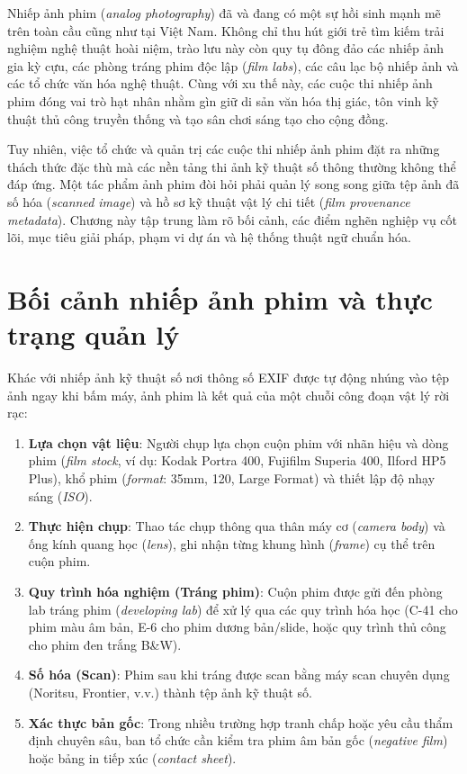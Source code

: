
Nhiếp ảnh phim (\textit{analog photography}) đã và đang có một sự hồi sinh mạnh mẽ trên toàn cầu cũng như tại Việt Nam. Không chỉ thu hút giới trẻ tìm kiếm trải nghiệm nghệ thuật hoài niệm, trào lưu này còn quy tụ đông đảo các nhiếp ảnh gia kỳ cựu, các phòng tráng phim độc lập (\textit{film labs}), các câu lạc bộ nhiếp ảnh và các tổ chức văn hóa nghệ thuật. Cùng với xu thế này, các cuộc thi nhiếp ảnh phim đóng vai trò hạt nhân nhằm gìn giữ di sản văn hóa thị giác, tôn vinh kỹ thuật thủ công truyền thống và tạo sân chơi sáng tạo cho cộng đồng.

Tuy nhiên, việc tổ chức và quản trị các cuộc thi nhiếp ảnh phim đặt ra những thách thức đặc thù mà các nền tảng thi ảnh kỹ thuật số thông thường không thể đáp ứng. Một tác phẩm ảnh phim đòi hỏi phải quản lý song song giữa tệp ảnh đã số hóa (\textit{scanned image}) và hồ sơ kỹ thuật vật lý chi tiết (\textit{film provenance metadata}). Chương này tập trung làm rõ bối cảnh, các điểm nghẽn nghiệp vụ cốt lõi, mục tiêu giải pháp, phạm vi dự án và hệ thống thuật ngữ chuẩn hóa.

\section{Bối cảnh nhiếp ảnh phim và thực trạng quản lý}
\label{s:c1_context}

Khác với nhiếp ảnh kỹ thuật số nơi thông số EXIF được tự động nhúng vào tệp ảnh ngay khi bấm máy, ảnh phim là kết quả của một chuỗi công đoạn vật lý rời rạc:
\begin{enumerate}
    \item \textbf{Lựa chọn vật liệu}: Người chụp lựa chọn cuộn phim với nhãn hiệu và dòng phim (\textit{film stock}, ví dụ: Kodak Portra 400, Fujifilm Superia 400, Ilford HP5 Plus), khổ phim (\textit{format}: 35mm, 120, Large Format) và thiết lập độ nhạy sáng (\textit{ISO}).
    \item \textbf{Thực hiện chụp}: Thao tác chụp thông qua thân máy cơ (\textit{camera body}) và ống kính quang học (\textit{lens}), ghi nhận từng khung hình (\textit{frame}) cụ thể trên cuộn phim.
    \item \textbf{Quy trình hóa nghiệm (Tráng phim)}: Cuộn phim được gửi đến phòng lab tráng phim (\textit{developing lab}) để xử lý qua các quy trình hóa học (C-41 cho phim màu âm bản, E-6 cho phim dương bản/slide, hoặc quy trình thủ công cho phim đen trắng B\&W).
    \item \textbf{Số hóa (Scan)}: Phim sau khi tráng được scan bằng máy scan chuyên dụng (Noritsu, Frontier, v.v.) thành tệp ảnh kỹ thuật số.
    \item \textbf{Xác thực bản gốc}: Trong nhiều trường hợp tranh chấp hoặc yêu cầu thẩm định chuyên sâu, ban tổ chức cần kiểm tra phim âm bản gốc (\textit{negative film}) hoặc bảng in tiếp xúc (\textit{contact sheet}).
\end{enumerate}

